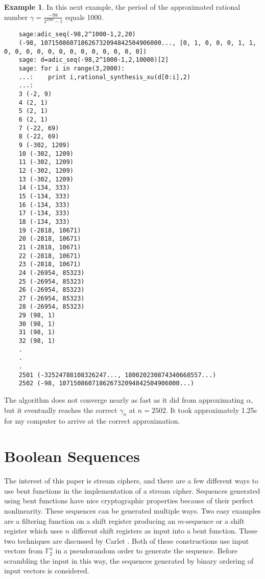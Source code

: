 \documentclass[english]{article}
\def\gftwo{\mathbb{F}_2}
\theoremstyle{plain}
\theoremstyle{definition}
\newtheorem{example}[theorem]{Example}
\theoremstyle{remark}
\begin{document}
\begin{example}
  \par In this next example, the period of the approximated rational
  number $\gamma=\frac{-98}{2^{1000}-1}$ equals 1000.
  \begin{lstlisting}
    sage:adic_seq(-98,2^1000-1,2,20)
    (-98, 107150860718626732094842504906000..., [0, 1, 0, 0, 0, 1, 1, 0, 0, 0, 0, 0, 0, 0, 0, 0, 0, 0, 0, 0])
    sage: d=adic_seq(-98,2^1000-1,2,10000)[2]
    sage: for i in range(3,2000):                           
    ...:    print i,rational_synthesis_xu(d[0:i],2)
    ...:     
    3 (-2, 9)
    4 (2, 1)
    5 (2, 1)
    6 (2, 1)
    7 (-22, 69)
    8 (-22, 69)
    9 (-302, 1209)
    10 (-302, 1209)
    11 (-302, 1209)
    12 (-302, 1209)
    13 (-302, 1209)
    14 (-134, 333)
    15 (-134, 333)
    16 (-134, 333)
    17 (-134, 333)
    18 (-134, 333)
    19 (-2818, 10671)
    20 (-2818, 10671)
    21 (-2818, 10671)
    22 (-2818, 10671)
    23 (-2818, 10671)
    24 (-26954, 85323)
    25 (-26954, 85323)
    26 (-26954, 85323)
    27 (-26954, 85323)
    28 (-26954, 85323)
    29 (98, 1)
    30 (98, 1)
    31 (98, 1)
    32 (98, 1)
    .
    .
    .
    2501 (-32524788108326247..., 180020230874340668557...)
    2502 (-98, 107150860718626732094842504906000...)
  \end{lstlisting}
  \par The algorithm does not
  converge nearly as fast as it did from approximating $\alpha$, but it
  eventually reaches the correct $\gamma_n$ at $n=2502$. It took
  approximately 1.25s for my computer to arrive at the correct approximation.
\end{example}

\section{Boolean Sequences}\label{sec:boolean-sequences}
\par The interest of this paper is stream ciphers, and there are a few
different ways to use bent functions in the implementation of a stream
cipher. Sequences generated using bent functions have nice cryptographic
properties because of their perfect nonlinearity. These sequences can be
generated multiple ways. Two easy examples are a filtering function on a
shift register producing an $m$-sequence or a shift register which uses $n$
different shift registers as input into a bent function. These two
techniques are discussed by Carlet \cite{col:c06}. Both of these
constructions use input vectors from $\gftwo^n$ in a pseudorandom order to
generate the sequence. Before scrambling the input in this way, the
sequences generated by binary ordering of input vectors is
considered.
\end{document}
